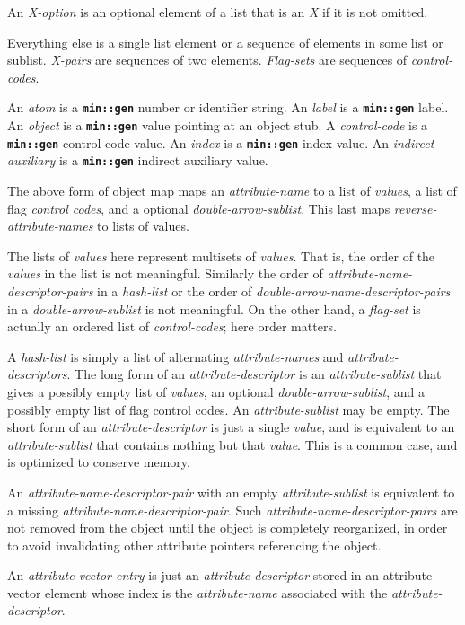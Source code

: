 \documentclass[12pt]{article}
\newcommand{\TT}[1]{{\tt \bfseries #1}}
\begin{document}
An {\em X-option} is an optional element of a list that is an {\em X} if
it is not omitted.

Everything else is a single list element or
a sequence of elements in some list or sublist.
{\em X-pairs} are sequences of two elements.
{\em Flag-sets} are sequences of {\em control-codes}.

An {\em atom} is a \TT{min::gen} number or identifier string.
An {\em label} is a \TT{min::gen} label.
An {\em object} is a \TT{min::gen} value pointing at an object stub.
A {\em control-code} is a \TT{min::gen} control code value.
An {\em index} is a \TT{min::gen} index value.
An {\em indirect-auxiliary} is a \TT{min::gen} indirect auxiliary value.

The above form of object map maps an {\em attribute-name} to a list of
{\em values}, a list of flag {\em control codes}, and a optional
{\em double-arrow-sublist}.  This last maps {\em reverse-attribute-names}
to lists of values.

The lists of {\em values} here represent multisets of {\em values}.
That is, the
order of the {\em values} in the list is not meaningful.
Similarly the order of {\em attribute-name-descriptor-pairs}
in a {\em hash-list}
or the order of {\em double-arrow-name-descriptor-pairs}
in a {\em double-arrow-sublist} is not meaningful.
On the other hand, a {\em flag-set} is actually an ordered list
of {\em control-codes}; here order matters.

A {\em hash-list} is simply a list of alternating {\em attribute-names}
and {\em attribute-descriptors}.
The long form of an {\em attribute-descriptor} is an
{\em attribute-sublist} that gives  a possibly empty list of {\em values},
an optional {\em double-arrow-sublist}, and a possibly empty
list of flag control codes.
An {\em attribute-sublist} may be empty.
The short form of an {\em attribute-descriptor} is just a single
{\em value}, and is equivalent to an {\em attribute-sublist}
that contains nothing but that {\em value}.
This is a common case, and is optimized to conserve memory.

An {\em attribute-name-descriptor-pair} with an
empty {\em attribute-sublist} is equivalent to a missing
{\em attribute-name-descriptor-pair}.
Such {\em attri\-bute-name-descriptor-pairs}
are not
removed from the object until the object is completely reorganized,
in order to avoid invalidating other attribute pointers referencing the object.

An {\em attribute-vector-entry} is just an {\em attribute-descriptor}
stored in an attribute vector element whose index is the
{\em attribute-name} associated with the {\em attribute-descriptor}.
\end{document}
